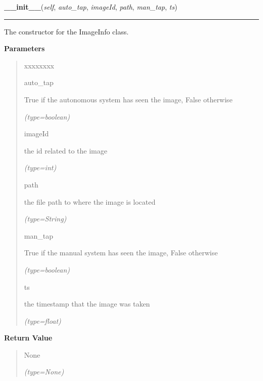 \hspace{.8\funcindent}\begin{boxedminipage}{\funcwidth}

    \raggedright \textbf{\_\_init\_\_}(\textit{self}, \textit{auto\_tap}, \textit{imageId}, \textit{path}, \textit{man\_tap}, \textit{ts})

    \vspace{-1.5ex}

    \rule{\textwidth}{0.5\fboxrule}
\setlength{\parskip}{2ex}
    The constructor for the ImageInfo class.

\setlength{\parskip}{1ex}
      \textbf{Parameters}
      \vspace{-1ex}

      \begin{quote}
        \begin{Ventry}{xxxxxxxx}

          \item[auto\_tap]

          True if the autonomous system has seen the image, False otherwise

            {\it (type=boolean)}

          \item[imageId]

          the id related to the image

            {\it (type=int)}

          \item[path]

          the file path to where the image is located

            {\it (type=String)}

          \item[man\_tap]

          True if the manual system has seen the image, False otherwise

            {\it (type=boolean)}

          \item[ts]

          the timestamp that the image was taken

            {\it (type=float)}

        \end{Ventry}

      \end{quote}

      \textbf{Return Value}
    \vspace{-1ex}

      \begin{quote}
      None

      {\it (type=None)}

      \end{quote}

    \end{boxedminipage}

